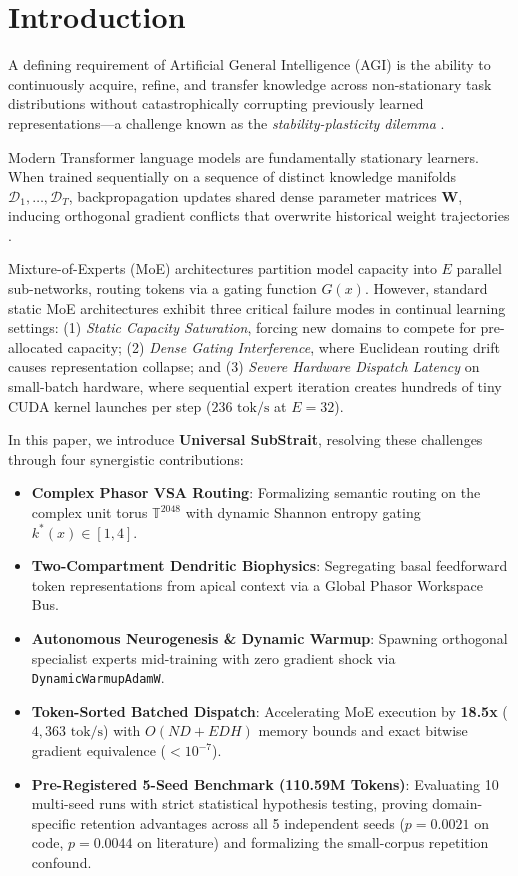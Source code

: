 \documentclass[10pt,twocolumn,letterpaper]{article}
\begin{document}
\section{Introduction}
A defining requirement of Artificial General Intelligence (AGI) is the ability to continuously acquire, refine, and transfer knowledge across non-stationary task distributions without catastrophically corrupting previously learned representations---a challenge known as the \textit{stability-plasticity dilemma} \cite{grossberg1982, french1999}. 

Modern Transformer language models \cite{vaswani2017} are fundamentally stationary learners. When trained sequentially on a sequence of distinct knowledge manifolds $\mathcal{D}_1, \dots, \mathcal{D}_T$, backpropagation updates shared dense parameter matrices $\mathbf{W}$, inducing orthogonal gradient conflicts that overwrite historical weight trajectories \cite{mccloskey1989, kirkpatrick2017}.

Mixture-of-Experts (MoE) architectures \cite{shazeer2017, fedus2022} partition model capacity into $E$ parallel sub-networks, routing tokens via a gating function $G(x)$. However, standard static MoE architectures exhibit three critical failure modes in continual learning settings: (1) \textit{Static Capacity Saturation}, forcing new domains to compete for pre-allocated capacity; (2) \textit{Dense Gating Interference}, where Euclidean routing drift causes representation collapse; and (3) \textit{Severe Hardware Dispatch Latency} on small-batch hardware, where sequential expert iteration creates hundreds of tiny CUDA kernel launches per step ($236\text{ tok/s}$ at $E=32$).

In this paper, we introduce \textbf{Universal SubStrait}, resolving these challenges through four synergistic contributions:
\begin{itemize}
    \item \textbf{Complex Phasor VSA Routing}: Formalizing semantic routing on the complex unit torus $\mathbb{T}^{2048}$ with dynamic Shannon entropy gating $k^*(x) \in [1, 4]$.
    \item \textbf{Two-Compartment Dendritic Biophysics}: Segregating basal feedforward token representations from apical context via a Global Phasor Workspace Bus.
    \item \textbf{Autonomous Neurogenesis \& Dynamic Warmup}: Spawning orthogonal specialist experts mid-training with zero gradient shock via \texttt{DynamicWarmupAdamW}.
    \item \textbf{Token-Sorted Batched Dispatch}: Accelerating MoE execution by \textbf{18.5x} ($4,363\text{ tok/s}$) with $O(N D + E D H)$ memory bounds and exact bitwise gradient equivalence ($< 10^{-7}$).
    \item \textbf{Pre-Registered 5-Seed Benchmark (110.59M Tokens)}: Evaluating 10 multi-seed runs with strict statistical hypothesis testing, proving domain-specific retention advantages across all 5 independent seeds ($p=0.0021$ on code, $p=0.0044$ on literature) and formalizing the small-corpus repetition confound.
\end{itemize}
\end{document}
